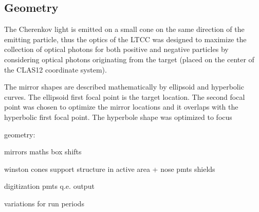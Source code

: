 \subsection{Geometry}

The Cherenkov light is emitted on a small cone on the same direction of the emitting particle, thus the optics of the LTCC was
designed to maximize the collection of optical photons for both positive and negative particles by considering
optical photons originating from the target (placed on the center of the CLAS12 coordinate system).

The mirror shapes are described mathematically by ellipsoid and hyperbolic curves.
The ellipsoid first focal point is the target location. The second focal point was chosen
to optimize the mirror locations and it overlaps with the hyperbolic first focal point. The hyperbole shape was optimized to focus

geometry:

mirrors maths
box shifts

winston cones
support structure in active area  + nose
pmts shields

digitization
pmts q.e.
output


variations for run periods



